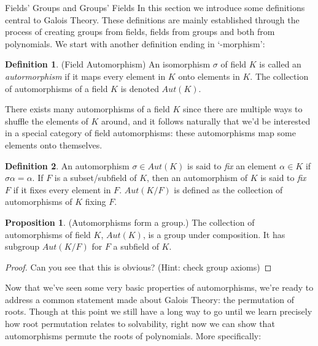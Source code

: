\documentclass[12pt]{article}
\theoremstyle{definition}
\theoremstyle{definition}
\newtheorem{definition}{Definition}[section]
\theoremstyle{definition}
\theoremstyle{definition}
\theoremstyle{definition}
\theoremstyle{definition}
\newtheorem{proposition}{Proposition}[section]
\theoremstyle{definition}
\begin{document}
\begin{section}{Fields' Groups and Groups' Fields}
    In this section we introduce some definitions central to Galois Theory. These definitions are mainly established through the process of 
    creating groups from fields, fields from groups and both from polynomials. We start with another definition ending in `-morphism':
    \begin{definition}{(Field Automorphism)}
        An isomorphism \(\sigma\) of field \(K\) is called an \textit{autormorphism} if it maps every element in \(K\) onto elements in \(K\).
        The collection of automorphisms of a field \(K\) is denoted \(Aut(K)\).
    \end{definition}
    There exists many automorphisms of a field \(K\) since there are multiple ways to shuffle the elements of \(K\) around, and it follows naturally 
    that we'd be interested in a special category of field automorphisms: these automorphisms map some elements onto themselves.
    \begin{definition}
        An automorphism \(\sigma\in Aut(K)\) is said to \textit{fix} an element \(\alpha \in K\) if \(\sigma \alpha = \alpha\). If \(F\) is a subset/subfield 
        of \(K\), then an automorphism of \(K\) is said to \textit{fix \(F\)} if it fixes every element in \(F\). \(Aut(K/F)\) is defined as the collection 
        of automorphisms of \(K\) fixing \(F\).
    \end{definition}

    \begin{proposition}{(Automorphisms form a group.)}
        The collection of automorphisms of field \(K\), \(Aut(K)\), is a group under composition. It has subgroup \(Aut(K/F)\) for \(F\) a subfield of \(K\).
        \begin{proof}
            Can you see that this is obvious? (Hint: check group axioms)
        \end{proof}
    \end{proposition}

    Now that we've seen some very basic properties of automorphisms, we're ready to address a common statement made about Galois Theory: the permutation of roots. 
    Though at this point we still have a long way to go until we learn precisely how root permutation relates to solvability, right now we can show that automorphisms 
    permute the roots of polynomials. More specifically:


\end{section}
\end{document}
